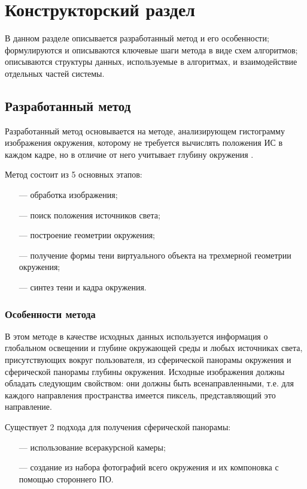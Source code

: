 \chapter{Конструкторский раздел}

В данном разделе описывается разработанный метод и его особенности; формулируются и описываются ключевые шаги метода в виде схем алгоритмов; описываются структуры данных, используемые в алгоритмах, и взаимодействие отдельных частей системы.

\section{Разработанный метод}

Разработанный метод основывается на методе, анализирующем гистограмму изображения окружения, которому не требуется вычислять положения ИС в каждом кадре, но в отличие от него учитывает глубину окружения \cite{osti2019real}.

Метод состоит из 5 основных этапов:

\begin{enumerate}
	\item[---] обработка изображения;
	\item[---] поиск положения источников света;
	\item[---] построение геометрии окружения;
	\item[---] получение формы тени виртуального объекта на трехмерной геометрии окружения;
	\item[---] синтез тени и кадра окружения.
\end{enumerate}

\subsection{Особенности метода}

В этом методе в качестве исходных данных используется информация о глобальном освещении и глубине окружающей среды и любых источниках света, присутствующих вокруг пользователя, из сферической панорамы окружения и сферической панорамы глубины окружения. Исходные изображения должны обладать следующим свойством: они должны быть всенаправленными, т.е. для каждого направления пространства имеется пиксель, представляющий это направление.

Существует 2 подхода для получения сферической панорамы:

\begin{enumerate}
	\item[---] использование всеракурсной камеры;
	\item[---] создание из набора фотографий всего окружения и их компоновка с помощью стороннего ПО.
\end{enumerate}


